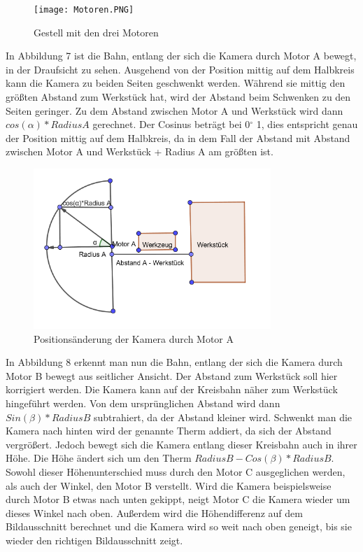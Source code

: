 \documentclass[12pt,a4paper,bibliography=totocnumbered,listof=totocnumbered]{scrartcl}
\begin{document}
\begin{figure}[htbp]
\centering 
\texttt{[image: Motoren.PNG]}
\caption{Gestell mit den drei Motoren}
\label{fig:Bild6}
\end{figure}
\break
In Abbildung 7 ist die Bahn, entlang der sich die Kamera durch Motor A bewegt, in der Draufsicht zu sehen. Ausgehend von der Position mittig auf dem Halbkreis kann die Kamera zu beiden Seiten geschwenkt werden. Während sie mittig den größten Abstand zum Werkstück hat, wird der Abstand beim Schwenken zu den Seiten geringer. Zu dem Abstand zwischen Motor A und Werkstück wird dann $cos(\alpha) * Radius A$ gerechnet. Der Cosinus beträgt bei 0$^\circ$ 1, dies entspricht genau der Position mittig auf dem Halbkreis, da in dem Fall der Abstand mit Abstand zwischen Motor A und Werkstück + Radius A am größten ist. 
\begin{figure}[htbp]
\centering 
\includegraphics[width=0.8\textwidth]{Motor_A.PNG}
\caption{Positionsänderung der Kamera durch Motor A}
\label{fig:Bild7}
\end{figure}
\break
In Abbildung 8 erkennt man nun die Bahn, entlang der sich die Kamera durch Motor B bewegt aus seitlicher Ansicht. Der Abstand zum Werkstück soll hier korrigiert werden. Die Kamera kann auf der Kreisbahn näher zum Werkstück hingeführt werden. Von dem ursprünglichen Abstand wird dann $Sin(\beta)*Radius B$ subtrahiert, da der Abstand kleiner wird. Schwenkt man die Kamera nach hinten wird der genannte Therm addiert, da sich der Abstand vergrößert. Jedoch bewegt sich die Kamera entlang dieser Kreisbahn auch in ihrer Höhe. Die Höhe ändert sich um den Therm $Radius B - Cos(\beta) *Radius B$. Sowohl dieser Höhenunterschied muss durch den Motor C ausgeglichen werden, als auch der Winkel, den Motor B verstellt. Wird die Kamera beispielsweise durch Motor B etwas nach unten gekippt, neigt Motor C die Kamera wieder um dieses Winkel nach oben. Außerdem wird die Höhendifferenz auf dem Bildausschnitt berechnet und die Kamera wird so weit nach oben geneigt, bis sie wieder den richtigen Bildausschnitt zeigt.
\end{document}
